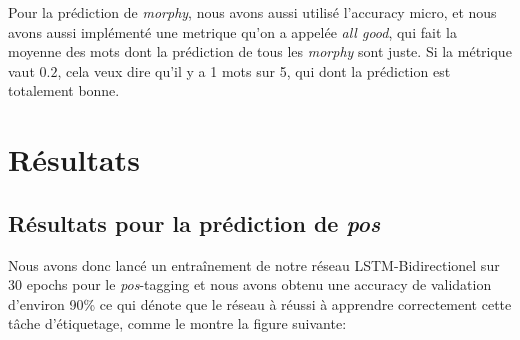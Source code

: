 \documentclass[a4paper]{article}
\begin{document}
Pour la prédiction de \textit{morphy}, nous avons aussi utilisé l'accuracy micro, et nous avons aussi implémenté une 
metrique qu'on a appelée \textit{all good}, qui fait la moyenne des mots dont la prédiction de tous les \textit{morphy}
sont juste. Si la métrique vaut $0.2$, cela veux dire qu'il y a 1 mots sur 5, qui dont la prédiction est totalement bonne.


\section{Résultats}

\subsection{Résultats pour la prédiction de \textit{pos}}
Nous avons donc lancé un entraînement de notre réseau LSTM-Bidirectionel sur 30 epochs pour le \textit{pos}-tagging et 
nous avons obtenu une accuracy de validation d'environ 90\% ce qui dénote que le réseau à réussi à apprendre 
correctement cette tâche d'étiquetage, comme le montre la figure suivante:
\end{document}
